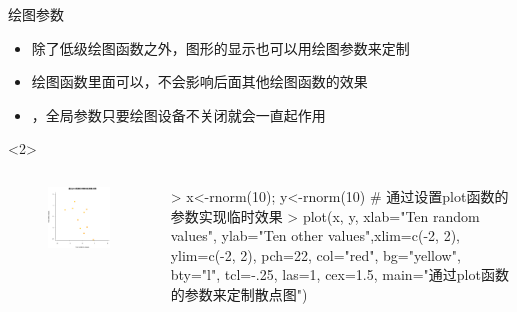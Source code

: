 \documentclass{beamerthemeMono}
\begin{document}
\begin{frame}[t,fragile]{\subsecname}{绘图参数}
\begin{itemize}
\item<1-> 除了低级绘图函数之外，图形的显示也可以用绘图参数来定制
\item<2-> 绘图函数里面可以，不会影响后面其他绘图函数的效果
\item<3-> ，全局参数只要绘图设备不关闭就会一直起作用
\end{itemize}

\begin{overlayarea}{\textwidth}{\textheight}
\begin{onlyenv}<2>
\begin{columns}
        \begin{column}{.4\textwidth}
          \begin{figure}
            \centering
            \includegraphics[width=\columnwidth]{plot.png}
          \end{figure}
        \end{column}

        \begin{column}{.6\textwidth}
 \centering
\begin{rcode}
> x<-rnorm(10); y<-rnorm(10)
# 通过设置plot函数的参数实现临时效果
> plot(x, y, xlab="Ten random values", ylab="Ten other values",xlim=c(-2, 2), ylim=c(-2, 2), pch=22, col="red", bg="yellow", bty="l", tcl=-.25, las=1, cex=1.5, main="通过plot函数的参数来定制散点图")
\end{rcode}
        \end{column}
      \end{columns}
\end{onlyenv}


\end{overlayarea}
\end{frame}
\end{document}
